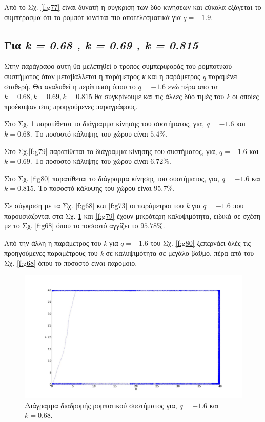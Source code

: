 Από το Σχ. \ref{f:g77} είναι δυνατή η σύγκριση των δύο κινήσεων και εύκολα εξάγεται το
συμπέρασμα ότι το ρομπότ κινείται πιο αποτελεσματικά για $q = -1.9$.

\clearpage

\subsection{Για \emph{k = 0.68 , k = 0.69 , k = 0.815}}
\label{par:g2}
Στην παράγραφο αυτή θα μελετηθεί ο τρόπος συμπεριφοράς του ρομποτικού συστήματος όταν μεταβάλλεται η παράμετρος \emph{κ} και η παράμετρος \emph{q} παραμένει σταθερή. Θα αναλυθεί η περίπτωση όπου το $ q =-1.6$ ενώ πέρα απο τα $k = 0.68 , k = 0.69 , k = 0.815$ θα συγκρίνουμε και τις άλλες δύο τιμές του \emph{k} οι οποίες προέκυψαν στις προηγούμενες παραγράφους.

Στο Σχ. \ref{f:g78} παρατίθεται το διάγραμμα κίνησης του συστήματος, για, $q = -1.6$ και $k = 0.68$.
Το ποσοστό κάλυψης του χώρου είναι  $5.4 \%$. 

Στο Σχ.\ref{f:g79} παρατίθεται το διάγραμμα κίνησης του συστήματος, για, $q = -1.6$ και $k = 0.69$.
Το ποσοστό κάλυψης του χώρου είναι  $6.72 \%$.

Στο Σχ. \ref{f:g80} παρατίθεται το διάγραμμα κίνησης του συστήματος, για, $q = -1.6$ και $k = 0.815$.
Το ποσοστό κάλυψης του χώρου είναι  $95.7\%$.

Σε σύγκριση με τα Σχ. \ref{f:g68} και \ref{f:g73} οι παράμετροι του \emph{k} για $q = -1.6$ που παρουσιάζονται στα Σχ. \ref{f:g78} και \ref{f:g79} έχουν μικρότερη καλυψιμότητα, ειδικά σε σχέση με το 
Σχ. \ref{f:g68} όπου το ποσοστό αγγίζει το $95.78\%$.

Από την άλλη η παράμετρος του \emph{k} για $q = -1.6$ του Σχ. \ref{f:g80} ξεπερνάει όλές τις προηγούμενες παραμέτρους του \emph{k} σε καλυψιμότητα σε μεγάλο βαθμό, πέρα από του Σχ. \ref{f:g68} όπου το ποσοστό είναι παρόμοιο.

\begin{figure}[ht]
	\centering
	\includegraphics[width=1\linewidth]{LateX images/log/k/g1-1.6}
	\caption{Διάγραμμα διαδρομής ρομποτικού συστήματος για, $q = -1.6$ και $k = 0.68$.}
	\label{f:g78}	
\end{figure}

